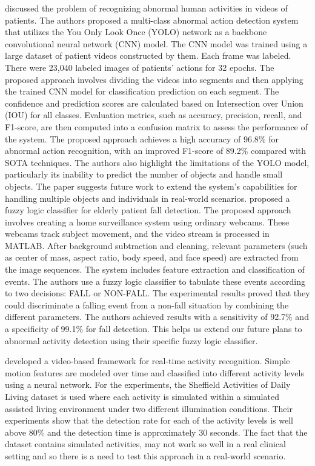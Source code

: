 \cite{UET-Study} discussed the problem of recognizing abnormal human activities in videos of patients. The authors proposed a multi-class abnormal action detection system that utilizes the You Only Look Once (YOLO) network as a backbone convolutional neural network (CNN) model. The CNN model was trained using a large dataset of patient videos constructed by them. Each frame was labeled. There were 23,040 labeled images of patients’ actions for 32 epochs.
The proposed approach involves dividing the videos into segments and then applying the trained CNN model for classification prediction on each segment. The confidence and prediction scores are calculated based on Intersection over Union (IOU) for all classes. Evaluation metrics, such as accuracy, precision, recall, and F1-score, are then computed into a confusion matrix to assess the performance of the system. The proposed approach achieves a high accuracy of 96.8\% for abnormal action recognition, with an improved F1-score of 89.2\% compared with SOTA techniques. The authors also highlight the limitations of the YOLO model, particularly its inability to predict the number of objects and handle small objects. The paper suggests future work to extend the system's capabilities for handling multiple objects and individuals in real-world scenarios. 
\cite{fuzzy} proposed a fuzzy logic classifier for elderly patient fall detection. The proposed approach involves creating a home surveillance system using ordinary webcams. These webcams track subject movement, and the video stream is processed in MATLAB. After background subtraction and cleaning, relevant parameters (such as center of mass, aspect ratio, body speed, and face speed) are extracted from the image sequences. The system includes feature extraction and classification of events. The authors use a fuzzy logic classifier to tabulate these events according to two decisions: FALL or NON-FALL. The experimental results proved that they could discriminate a falling event from a non-fall situation by combining the different parameters. The authors achieved results with a sensitivity of 92.7\% and a specificity of 99.1\% for fall detection. This helps us extend our future plans to abnormal activity detection using their specific fuzzy logic classifier. 

\cite{neural-network} developed a video-based framework for real-time activity recognition. Simple motion features are modeled over time and classified into different activity levels using a neural network. For the experiments, the Sheffield Activities of Daily Living dataset is used where each activity is simulated within a simulated assisted living environment under two different illumination conditions. Their experiments show that the detection rate for each of the activity levels is well above 80\% and the detection time is approximately 30 seconds. The fact that the dataset contains simulated activities, may not work so well in a real clinical setting and so there is a need to test this approach in a real-world scenario.

